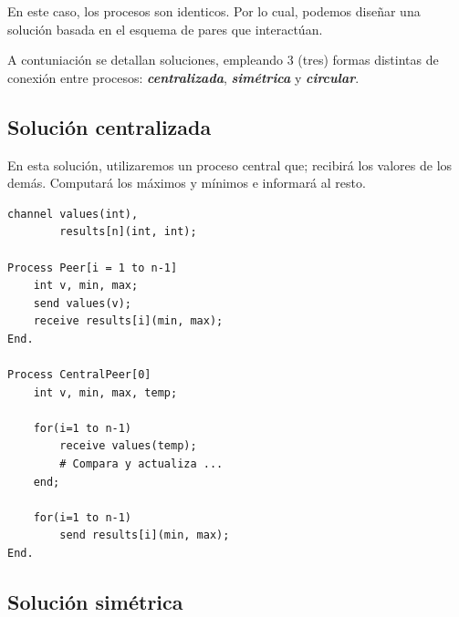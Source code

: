 \documentclass[a4paper, 10pt]{report}
\begin{document}
En este caso, los procesos son identicos. Por lo cual, podemos diseñar una solución basada en el esquema de pares que interactúan. 

A contuniación se detallan soluciones, empleando 3 (tres) formas distintas de conexión entre procesos: \textbf{\emph{centralizada}}, \textbf{\emph{simétrica}} y \textbf{\emph{circular}}.

\subsection{Solución centralizada}

En esta solución, utilizaremos un proceso central que; recibirá los valores de los demás. Computará los máximos y mínimos e informará al resto.

\begin{multicols}{2}
\begin{lstlisting}
channel values(int),
		results[n](int, int);
	
Process Peer[i = 1 to n-1]
	int v, min, max;
	send values(v);
	receive results[i](min, max);
End.

Process CentralPeer[0]
	int v, min, max, temp;

	for(i=1 to n-1)
		receive values(temp);
		# Compara y actualiza ...
	end;

	for(i=1 to n-1)
		send results[i](min, max);
End.
\end{lstlisting}

\columnbreak

\centering
\vspace*{\fill}
\vspace*{\fill}
\end{multicols}

\subsection{Solución simétrica}
\end{document}
